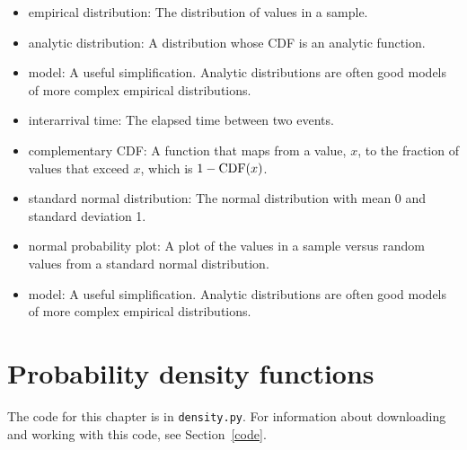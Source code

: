 \documentclass[12pt]{book}
\begin{document}
\begin{itemize}

\item empirical distribution: The distribution of values in a sample.
   

\item analytic distribution: A distribution whose CDF is an analytic
function.

\item model: A useful simplification.  Analytic distributions are
often good models of more complex empirical distributions.

\item interarrival time: The elapsed time between two events.

\item complementary CDF: A function that maps from a value, $x$,
to the fraction of values that exceed $x$, which is $1 - \mathrm{CDF}(x)$.

\item standard normal distribution: The normal distribution with
mean 0 and standard deviation 1.

\item normal probability plot: A plot of the values in a sample versus
random values from a standard normal distribution.

\item model: A useful simplification.  Analytic distributions are
often good models of more complex empirical distributions.

\end{itemize}


\chapter{Probability density functions}
\label{density}

The code for this chapter is in {\tt density.py}.  For information
about downloading and working with this code, see Section~\ref{code}.
\end{document}
